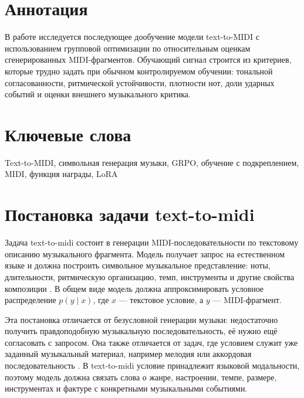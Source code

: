 \documentclass[a4paper,12pt]{extarticle}
\begin{document}
\newpage
\setcounter{page}{2}

{
	\hypersetup{linkcolor=black}
	\tableofcontents
}

\newpage

\newpage
\section*{Аннотация}   %
В работе исследуется последующее дообучение модели text-to-MIDI с
использованием групповой оптимизации по относительным оценкам
сгенерированных MIDI-фрагментов. Обучающий сигнал строится из критериев,
которые трудно задать при обычном контролируемом обучении: тональной
согласованности, ритмической устойчивости, плотности нот, доли ударных
событий и оценки внешнего музыкального критика.


\section*{Ключевые слова}
Text-to-MIDI, символьная генерация музыки, GRPO, обучение с подкреплением,
MIDI, функция награды, LoRA
\pagebreak
\newpage 

\section{Постановка задачи text-to-midi}
\label{sec:problem}

Задача text-to-midi состоит в генерации MIDI-последовательности по
текстовому описанию музыкального фрагмента. Модель получает запрос на
естественном языке и должна построить символьное музыкальное представление:
ноты, длительности, ритмическую организацию, темп, инструменты и другие
свойства композиции
\cite{wu2022texttomusic,lu2023musecoco,midicaps2024,text2midi2025}.
В общем виде модель должна аппроксимировать условное распределение
$p(y \mid x)$, где $x$ --- текстовое условие, а $y$ --- MIDI-фрагмент.

Эта постановка отличается от безусловной генерации музыки: недостаточно
получить правдоподобную музыкальную последовательность, её нужно ещё
согласовать с запросом. Она также отличается от задач, где условием
служит уже заданный музыкальный материал, например мелодия или аккордовая
последовательность \cite{ju2022telemelody,lu2023musecoco}. В text-to-midi
условие принадлежит языковой модальности, поэтому модель должна связать
слова о жанре, настроении, темпе, размере, инструментах и фактуре с
конкретными музыкальными событиями.
\end{document}
